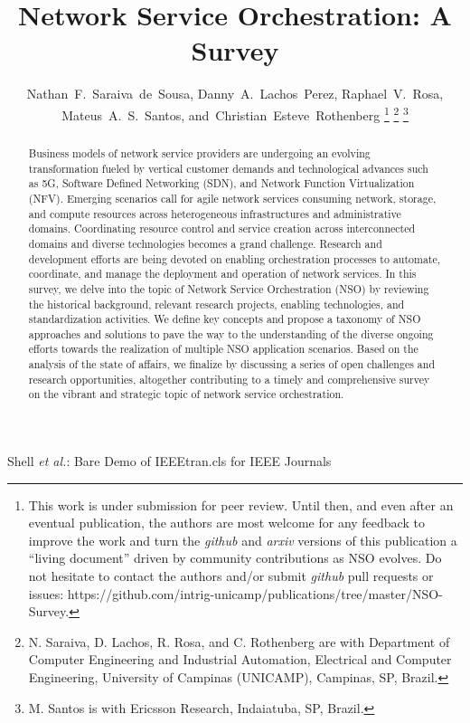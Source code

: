 \documentclass[journal]{IEEEtran}
\begin{document}
\title{Network Service Orchestration: A Survey}

\author{Nathan~F.~Saraiva~de~Sousa, Danny~A.~Lachos~Perez, Raphael~V.~Rosa, \\Mateus~A.~S.~Santos, and~Christian~Esteve~Rothenberg
\thanks{This work is under submission for peer review. Until then, and even after an eventual publication, the authors are most welcome for any feedback to improve the work and turn the \textit{github} and \textit{arxiv} versions of this publication a ``living document'' driven by community contributions as NSO evolves.  
Do not hesitate to contact the authors and/or submit \textit{github} pull requests or issues: 
https://github.com/intrig-unicamp/publications/tree/master/NSO-Survey.}
\thanks{N. Saraiva, D. Lachos, R. Rosa, and C. Rothenberg are with Department of Computer Engineering and Industrial Automation, Electrical and Computer Engineering, University of Campinas (UNICAMP), Campinas, SP, Brazil.}
\thanks{M. Santos is with Ericsson Research, Indaiatuba, SP, Brazil.}
}

{Shell \MakeLowercase{\textit{et al.}}: Bare Demo of IEEEtran.cls for IEEE Journals}

\maketitle

\begin{abstract}
Business models of network service providers are undergoing an evolving transformation fueled by vertical customer demands and technological advances such as 5G, Software Defined Networking (SDN), and Network Function Virtualization (NFV). 
Emerging scenarios call for agile network services consuming network, storage, and compute resources across heterogeneous infrastructures and administrative domains. 
Coordinating resource control and service creation across interconnected domains and diverse technologies becomes a grand  challenge. Research and development efforts are being devoted on enabling orchestration processes to  automate, coordinate, and manage the deployment and operation of network services. 
In this survey, we delve into the topic of Network Service Orchestration (NSO) by reviewing the historical background, relevant   research projects, enabling technologies, and standardization activities. We define key concepts and propose a taxonomy of NSO approaches and solutions to pave the way to the understanding  of the diverse ongoing efforts towards the realization of multiple NSO application scenarios. Based on the analysis of the state of affairs, we finalize by discussing a series of open challenges and research opportunities, altogether contributing to a timely and comprehensive survey on the vibrant and strategic topic of network service orchestration.
\end{abstract}
\end{document}
